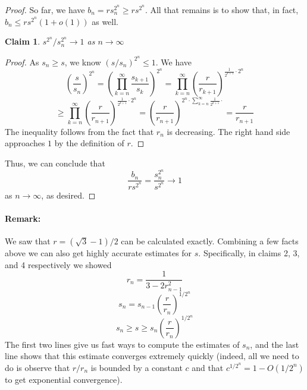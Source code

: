 \documentclass[12pt]{article}
\newtheorem{claim}[definition]{Claim}
\begin{document}
\begin{proof}
So far, we have $b_n = r s_n^{2^n} \ge r s^{2^n}$.
All that remains is to show that, in fact,
$b_n \le rs^{2^n}(1 + o(1))$ as well.

\begin{claim}
  $s^{2^n} / s_n^{2^n} \to 1$ as $n\to \infty$
\end{claim}
\begin{proof}
  As $s_n \ge s$, we know $(s/s_n)^{2^n} \le 1$.
  We have
  \[ \left(\frac{s}{s_n}\right)^{2^n}
  = \left(\prod_{k=n}^\infty \frac{s_{k+1}}{s_k}\right)^{2^n}
  = \prod_{k=n}^\infty \left(\frac{r}{r_{k+1}}\right)^{\frac{1}{2^{k+1}}\cdot 2^n}
  \]
  \[ \ge \prod_{k=n}^\infty \left(\frac{r}{r_{n+1}}\right)^{\frac{1}{2^{k+1}}\cdot 2^n}
  = \left(\frac{r}{r_{n+1}}\right)^{ 2^n\cdot\sum_{k=n}^\infty \frac{1}{2^{k+1}}\cdot}
  = \frac{r}{r_{n+1}}
  \]
  The inequality follows from the fact that $r_n$ is decreasing.
  The right hand side approaches $1$ by the definition of $r$.
\end{proof}

Thus, we can conclude that 
\[ \frac{b_n}{rs^{2^n}} = \frac{s_n^{2^n}}{s^{2^n}} \to 1 \]
as $n\to \infty$, as desired.
\end{proof}

\paragraph{Remark:}
We saw that $r = (\sqrt 3 - 1)/2$ can be calculated exactly.
Combining a few facts above we can also get highly accurate estimates for $s$.
Specifically, in claims 2, 3, and 4 respectively we showed
\[ r_n = \frac 1 {3 - 2r_{n-1}^2} \]
\[ s_n = s_{n-1} \left(\frac r {r_n}\right)^{1/2^n} \]
\[ s_n \ge s \ge s_n \left(\frac r {r_n}\right)^{1/2^n} \]
The first two lines give us fast ways to compute the estimates of $s_n$, and
the last line shows that this estimate converges extremely quickly
(indeed, all we need to do is observe that $r/r_n$ is bounded by a constant $c$
and that $c^{1/2^n} = 1 - O(1/2^n)$ to get exponential convergence).

{}

\end{document}
